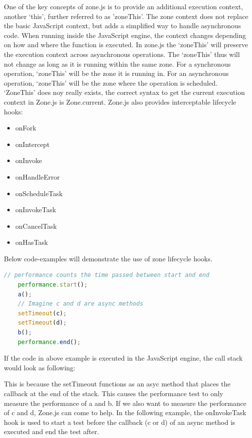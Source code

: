 One of the key concepts of zone.js is to provide an additional execution context, another ‘this’, further referred to as 'zoneThis'. The zone context does not replace the basic JavaScript context, but adds a simplified way to handle asynchronous code. When running inside the JavaScript engine, the context changes depending on how and where the function is executed. In zone.js the ‘zoneThis’ will preserve the execution context across asynchronous operations. The ‘zoneThis’ thus will not change as long as it is running within the same zone. For a synchronous operation, ‘zoneThis’ will be the zone it is running in. For an asynchronous operation, ‘zoneThis’ will be the zone where the operation is scheduled. ‘ZoneThis’ does noy really exists, the correct syntax to get the current execution context in Zone.js is Zone.current.
Zone.js also provides interceptable lifecycle hooks:
\begin{itemize}
	\item onFork
	\item onIntercept
	\item onInvoke
	\item onHandleError
	\item onScheduleTask
	\item onInvokeTask
	\item onCancelTask
	\item onHasTask
\end{itemize}

Below code-examples will demonstrate the use of zone lifecycle hooks.

\begin{lstlisting}[language=Javascript]
	// performance counts the time passed between start and end
	performance.start();
	a();
	// Imagine c and d are async methods
	setTimeout(c);
	setTimeout(d);
	b();
	performance.end();
\end{lstlisting}


If the code in above example is executed in the JavaScript engine, the call stack would look as following: 


This is because the setTimeout functions as an asyc method that places the callback at the end of the stack. This causes the performance test to only measure the performance of a and b. If we also want to measure the performance of c and d, Zone.js can come to help. In the following example, the onInvokeTask hook is used to start a test before the callback (c or d) of an async method is executed and end the test after.

